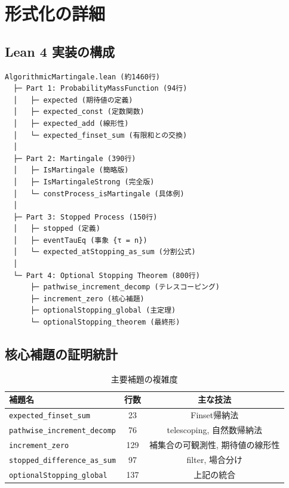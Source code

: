 \documentclass[a4paper,12pt]{ltjsarticle}
\theoremstyle{definition}
\begin{document}
\section{形式化の詳細}

\subsection{Lean 4 実装の構成}

\begin{computation}[実装の階層構造]
\begin{verbatim}
AlgorithmicMartingale.lean (約1460行)
  ├─ Part 1: ProbabilityMassFunction (94行)
  │   ├─ expected (期待値の定義)
  │   ├─ expected_const (定数関数)
  │   ├─ expected_add (線形性)
  │   └─ expected_finset_sum (有限和との交換)
  │
  ├─ Part 2: Martingale (390行)
  │   ├─ IsMartingale (簡略版)
  │   ├─ IsMartingaleStrong (完全版)
  │   └─ constProcess_isMartingale (具体例)
  │
  ├─ Part 3: Stopped Process (150行)
  │   ├─ stopped (定義)
  │   ├─ eventTauEq (事象 {τ = n})
  │   └─ expected_atStopping_as_sum (分割公式)
  │
  └─ Part 4: Optional Stopping Theorem (800行)
      ├─ pathwise_increment_decomp (テレスコーピング)
      ├─ increment_zero (核心補題)
      ├─ optionalStopping_global (主定理)
      └─ optionalStopping_theorem (最終形)
\end{verbatim}
\end{computation}

\subsection{核心補題の証明統計}

\begin{table}[h]
\centering
\caption{主要補題の複雑度}
\begin{tabular}{lcc}
\hline
補題名 & 行数 & 主な技法 \\
\hline
\texttt{expected\_finset\_sum} & 23 & Finset帰納法 \\
\texttt{pathwise\_increment\_decomp} & 76 & telescoping, 自然数帰納法 \\
\texttt{increment\_zero} & 129 & 補集合の可観測性, 期待値の線形性 \\
\texttt{stopped\_difference\_as\_sum} & 97 & filter, 場合分け \\
\texttt{optionalStopping\_global} & 137 & 上記の統合 \\
\hline
\end{tabular}
\end{table}
\end{document}
